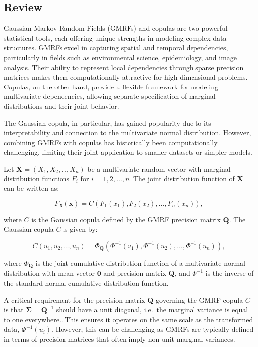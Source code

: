 \documentclass[journal=,manuscript=]{achemso}
\begin{document}
\subsection{Review}\label{review}

Gaussian Markov Random Fields (GMRFs) and copulas are two powerful
statistical tools, each offering unique strengths in modeling complex
data structures. GMRFs excel in capturing spatial and temporal
dependencies, particularly in fields such as environmental science,
epidemiology, and image analysis. Their ability to represent local
dependencies through sparse precision matrices makes them
computationally attractive for high-dimensional problems. Copulas, on
the other hand, provide a flexible framework for modeling multivariate
dependencies, allowing separate specification of marginal distributions
and their joint behavior.

The Gaussian copula, in particular, has gained popularity due to its
interpretability and connection to the multivariate normal distribution.
However, combining GMRFs with copulas has historically been
computationally challenging, limiting their joint application to smaller
datasets or simpler models.

Let \(\mathbf{X} = (X_1, X_2, \ldots, X_n)\) be a multivariate random
vector with marginal distribution functions \(F_i\) for
\(i = 1, 2, \ldots, n\). The joint distribution function of
\(\mathbf{X}\) can be written as:

\[
F_{\mathbf{X}}(\mathbf{x}) = C(F_1(x_1), F_2(x_2), \ldots, F_n(x_n)),
\]

where \(C\) is the Gaussian copula defined by the GMRF precision matrix
\(\mathbf{Q}\). The Gaussian copula \(C\) is given by:

\[
C(u_1, u_2, \ldots, u_n) = \Phi_\mathbf{Q}(\Phi^{-1}(u_1), \Phi^{-1}(u_2), \ldots, \Phi^{-1}(u_n)),
\]

where \(\Phi_\mathbf{Q}\) is the joint cumulative distribution function
of a multivariate normal distribution with mean vector \(\mathbf{0}\)
and precision matrix \(\mathbf{Q}\), and \(\Phi^{-1}\) is the inverse of
the standard normal cumulative distribution function.

A critical requirement for the precision matrix \(\mathbf{Q}\) governing
the GMRF copula \(C\) is that \(\mathbf{\Sigma} = \mathbf{Q}^{-1}\)
should have a unit diagonal, i.e.~the marginal variance is equal to one
everywhere.. This ensures it operates on the same scale as the
transformed data, \(\Phi^{-1}(u_i)\). However, this can be challenging
as GMRFs are typically defined in terms of precision matrices that often
imply non-unit marginal variances.
\end{document}
